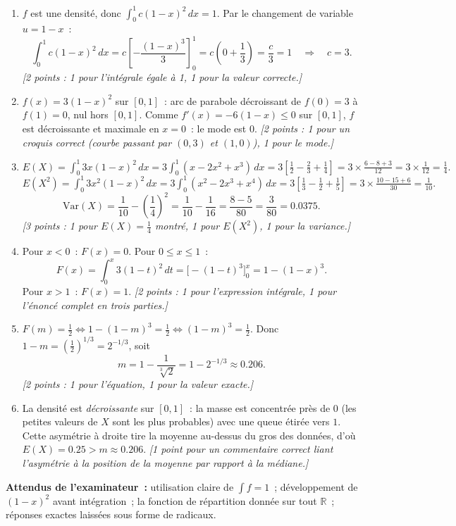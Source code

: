 \documentclass[11pt]{article}
\newcommand{\cle}[1]{{\popxbold\color{popdark}#1}}
\begin{document}
\begin{corrige}
\begin{enumerate}
\item $f$ est une densité, donc $\displaystyle\int_0^1 c(1-x)^2\,dx = 1$. Par le changement de variable $u = 1-x$~:
\[ \int_0^1 c(1-x)^2\,dx = c\left[-\frac{(1-x)^3}{3}\right]_0^1 = c\left(0 + \frac{1}{3}\right) = \frac{c}{3} = 1 \quad\Longrightarrow\quad c = 3. \]
\textit{[2 points : 1 pour l'intégrale égale à 1, 1 pour la valeur correcte.]}
\item $f(x) = 3(1-x)^2$ sur $[0,1]$~: arc de parabole décroissant de $f(0) = 3$ à $f(1) = 0$, nul hors $[0,1]$. Comme $f'(x) = -6(1-x) \leq 0$ sur $[0,1]$, $f$ est décroissante et maximale en $x = 0$~: le \cle{mode} est $0$.
\textit{[2 points : 1 pour un croquis correct (courbe passant par $(0,3)$ et $(1,0)$), 1 pour le mode.]}
\item $\displaystyle E(X) = \int_0^1 3x(1-x)^2\,dx = 3\int_0^1 (x - 2x^2 + x^3)\,dx = 3\left[\frac{1}{2} - \frac{2}{3} + \frac{1}{4}\right] = 3 \times \frac{6 - 8 + 3}{12} = 3 \times \frac{1}{12} = \frac{1}{4}.$
$\displaystyle E(X^2) = \int_0^1 3x^2(1-x)^2\,dx = 3\int_0^1 (x^2 - 2x^3 + x^4)\,dx = 3\left[\frac{1}{3} - \frac{1}{2} + \frac{1}{5}\right] = 3 \times \frac{10 - 15 + 6}{30} = \frac{1}{10}.$
\[ \mathrm{Var}(X) = \frac{1}{10} - \left(\frac{1}{4}\right)^2 = \frac{1}{10} - \frac{1}{16} = \frac{8 - 5}{80} = \frac{3}{80} = 0.0375. \]
\textit{[3 points : 1 pour $E(X)=\tfrac14$ montré, 1 pour $E(X^2)$, 1 pour la variance.]}
\item Pour $x < 0$~: $F(x) = 0$. Pour $0 \leq x \leq 1$~:
\[ F(x) = \int_0^x 3(1-t)^2\,dt = \Big[-(1-t)^3\Big]_0^x = 1 - (1-x)^3. \]
Pour $x > 1$~: $F(x) = 1$.
\textit{[2 points : 1 pour l'expression intégrale, 1 pour l'énoncé complet en trois parties.]}
\item $F(m) = \tfrac12 \Leftrightarrow 1 - (1-m)^3 = \tfrac12 \Leftrightarrow (1-m)^3 = \tfrac12$. Donc $1 - m = \left(\tfrac12\right)^{1/3} = 2^{-1/3}$, soit
\[ m = 1 - \frac{1}{\sqrt[3]{2}} = 1 - 2^{-1/3} \approx 0.206. \]
\textit{[2 points : 1 pour l'équation, 1 pour la valeur exacte.]}
\item La densité est \emph{décroissante} sur $[0,1]$~: la masse est concentrée près de $0$ (les petites valeurs de $X$ sont les plus probables) avec une queue étirée vers $1$. Cette asymétrie à droite tire la moyenne au-dessus du gros des données, d'où $E(X) = 0.25 > m \approx 0.206$.
\textit{[1 point pour un commentaire correct liant l'asymétrie à la position de la moyenne par rapport à la médiane.]}
\end{enumerate}
\textbf{Attendus de l'examinateur~:} utilisation claire de $\int f = 1$~; développement de $(1-x)^2$ avant intégration~; la fonction de répartition donnée sur tout $\mathbb{R}$~; réponses exactes laissées sous forme de radicaux.
\end{corrige}
\end{document}
